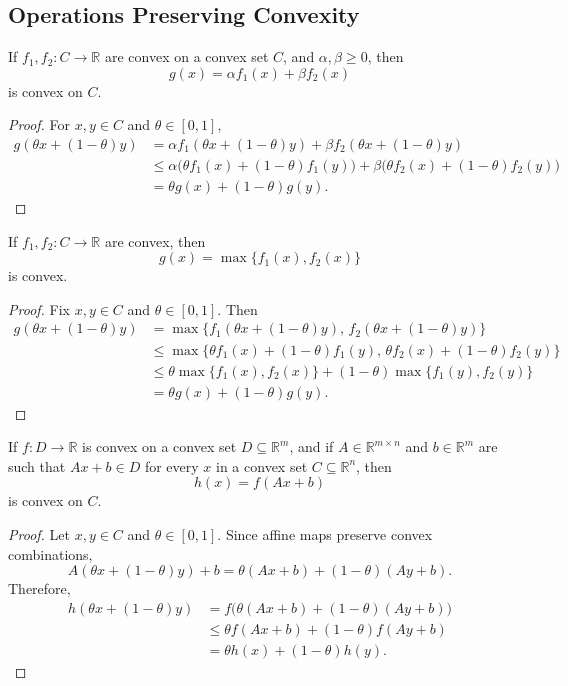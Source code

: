 \subsection{Operations Preserving Convexity}
\label{sec:l1-operations-preserving-convexity}

\begin{proposition}\label{prop:l1-nonnegative-weighted-sums}
	If $f_1,f_2:C \to \mathbb{R}$ are convex on a convex set $C$, and $\alpha,\beta \ge 0$, then
	\[
		g(x)=\alpha f_1(x)+\beta f_2(x)
	\]
	is convex on $C$.
\end{proposition}
\begin{proof}
	For $x,y \in C$ and $\theta \in [0,1]$,
	\begin{align*}
		g(\theta x+(1-\theta)y)
		 & = \alpha f_1(\theta x+(1-\theta)y)+\beta f_2(\theta x+(1-\theta)y) \\
		 & \le \alpha\bigl(\theta f_1(x)+(1-\theta)f_1(y)\bigr)
		+\beta\bigl(\theta f_2(x)+(1-\theta)f_2(y)\bigr) \\
		 & = \theta g(x)+(1-\theta)g(y).
	\end{align*}
\end{proof}

\begin{proposition}\label{prop:l1-pointwise-maxima}
	If $f_1,f_2:C \to \mathbb{R}$ are convex, then
	\[
		g(x)=\max\{f_1(x),f_2(x)\}
	\]
	is convex.
\end{proposition}
\begin{proof}
	Fix $x,y \in C$ and $\theta \in [0,1]$. Then
	\begin{align*}
		g(\theta x+(1-\theta)y)
		 & = \max\{f_1(\theta x+(1-\theta)y),\,f_2(\theta x+(1-\theta)y)\} \\
		 & \le \max\{\theta f_1(x)+(1-\theta)f_1(y),\,
		\theta f_2(x)+(1-\theta)f_2(y)\} \\
		 & \le \theta \max\{f_1(x),f_2(x)\} + (1-\theta)\max\{f_1(y),f_2(y)\} \\
		 & = \theta g(x)+(1-\theta)g(y).
	\end{align*}
\end{proof}

\begin{proposition}\label{prop:l1-composition-with-affine-maps}
	If $f:D \to \mathbb{R}$ is convex on a convex set $D \subseteq \mathbb{R}^m$, and if $A \in \mathbb{R}^{m \times n}$ and $b \in \mathbb{R}^m$ are such that $Ax+b \in D$ for every $x$ in a convex set $C \subseteq \mathbb{R}^n$, then
	\[
		h(x)=f(Ax+b)
	\]
	is convex on $C$.
\end{proposition}
\begin{proof}
	Let $x,y \in C$ and $\theta \in [0,1]$. Since affine maps preserve convex combinations,
	\[
		A(\theta x+(1-\theta)y)+b
		= \theta(Ax+b)+(1-\theta)(Ay+b).
	\]
	Therefore,
	\begin{align*}
		h(\theta x+(1-\theta)y)
		 & = f\bigl(\theta(Ax+b)+(1-\theta)(Ay+b)\bigr) \\
		 & \le \theta f(Ax+b)+(1-\theta)f(Ay+b) \\
		 & = \theta h(x)+(1-\theta)h(y).
	\end{align*}
\end{proof}


